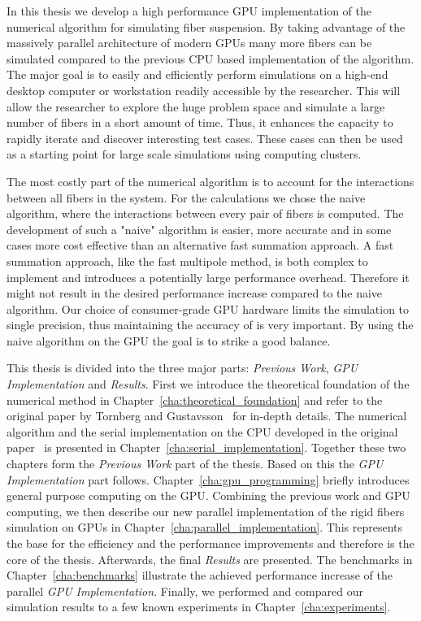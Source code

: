In this thesis we develop a high performance GPU implementation of the numerical algorithm for simulating fiber suspension. By taking advantage of the massively parallel architecture of modern GPUs many more fibers can be simulated compared to the previous CPU based implementation of the algorithm. The major goal is to easily and efficiently perform simulations on a high-end desktop computer or workstation readily accessible by the researcher. This will allow the researcher to explore the huge problem space and simulate a large number of fibers in a short amount of time. Thus, it enhances the capacity to rapidly iterate and discover interesting test cases. These cases can then be used as a starting point for large scale simulations using computing clusters.

The most costly part of the numerical algorithm is to account for the interactions between all fibers in the system. For the calculations we chose the naive algorithm, where the interactions between every pair of fibers is computed. The development of such a "naive" algorithm is easier, more accurate and in some cases more cost effective than an alternative fast summation approach. A fast summation approach, like the fast multipole method, is both complex to implement and introduces a potentially large performance overhead. Therefore it might not result in the desired performance increase compared to the naive algorithm. Our choice of consumer-grade GPU hardware limits the simulation to single precision, thus maintaining the accuracy of is very important. By using the naive algorithm on the GPU the goal is to strike a good balance.

This thesis is divided into the three major parts: \emph{Previous Work}, \emph{GPU Implementation} and \emph{Results}. First we introduce the theoretical foundation of the numerical method in Chapter~\ref{cha:theoretical_foundation} and refer to the original paper by Tornberg and Gustavsson~\cite{Tornberg2006} for in-depth details. The numerical algorithm and the serial implementation on the CPU developed in the original paper~\cite{Tornberg2006} is presented in Chapter~\ref{cha:serial_implementation}. Together these two chapters form the \emph{Previous Work} part of the thesis. Based on this the \emph{GPU Implementation} part follows. Chapter~\ref{cha:gpu_programming} briefly introduces general purpose computing on the GPU. Combining the previous work and GPU computing, we then describe our new parallel implementation of the rigid fibers simulation on GPUs in Chapter~\ref{cha:parallel_implementation}. This represents the base for the efficiency and the performance improvements and therefore is the core of the thesis. Afterwards, the final \emph{Results} are presented. The benchmarks in Chapter~\ref{cha:benchmarks} illustrate the achieved performance increase of the parallel \emph{GPU Implementation}. Finally, we performed and compared our simulation results to a few known experiments in Chapter~\ref{cha:experiments}.
